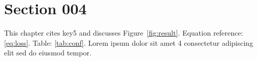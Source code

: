 \section{Section 004}\label{sec:s4}
This chapter cites key5 and discusses Figure~\ref{fig:result}.
Equation reference: \eqref{eq:loss}. Table: \ref{tab:conf}.
Lorem ipsum dolor sit amet 4 consectetur adipiscing elit sed do eiusmod tempor.
